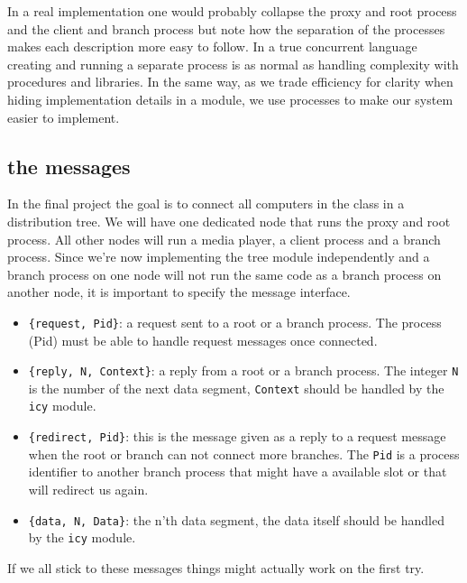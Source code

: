 \documentclass[a4paper,11pt]{article}
\begin{document}
In a real implementation one would probably collapse the proxy and root
process and the client and branch process but note how the separation
of the processes makes each description more easy to follow. In a true
concurrent language creating and running a separate process is as
normal as handling complexity with procedures and libraries. In the
same way, as we trade efficiency for clarity when hiding
implementation details in a module, we use processes to make our
system easier to implement.

\subsection{the messages}

In the final project the goal is to connect all computers in the class
in a distribution tree. We will have one dedicated node that runs the
proxy and root process. All other nodes will run a media player, a
client process and a branch process. Since we're now implementing the
tree module independently and a branch process on one node will not
run the same code as a branch process on another node, it is
important to specify the message interface.

\begin{itemize}

\item {\tt \{request, Pid\}}: a request sent to a root or a branch
  process. The process (Pid) must be able to handle request messages
  once connected.


\item {\tt \{reply, N, Context\}}: a reply from a root or a branch
  process. The integer {\tt N} is the number of the next data segment,
  {\tt Context} should be handled by the {\tt icy} module.

\item{\tt \{redirect, Pid\}}: this is the message given as a reply to a
  request message when the root or branch can not connect more
  branches. The {\tt Pid} is a process identifier to another branch
  process that might have a available slot or that will redirect us
  again.

\item {\tt \{data, N, Data\}}: the n'th data segment, the data itself
  should be handled by the {\tt icy} module.

\end{itemize}

If we all stick to these messages things might actually work on the first try.
\end{document}

